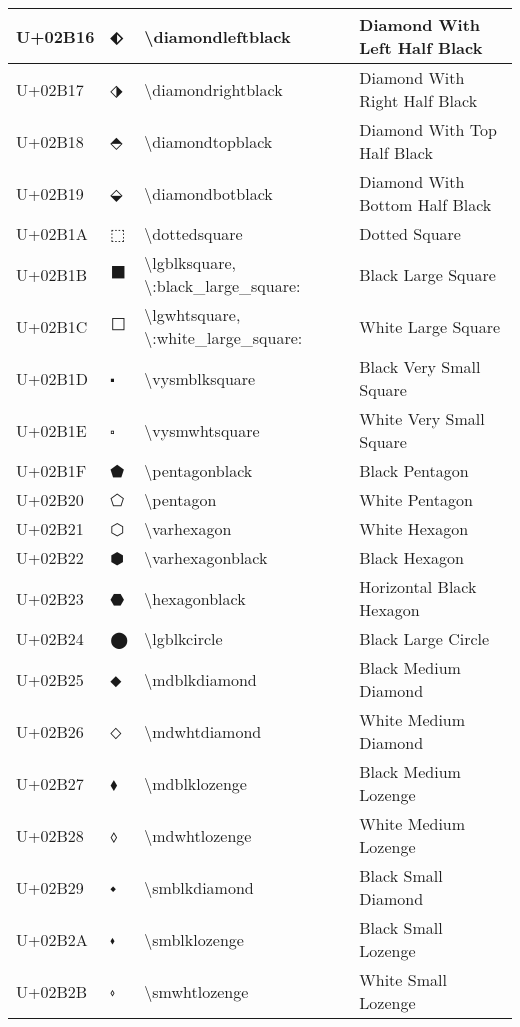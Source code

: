 \begin{table}[h]
\begin{tabulary}{\linewidth}{|L|L|L|L|}
\hline
U+02B16 & ⬖ & {\textbackslash}diamondleftblack & Diamond With Left Half Black \\
\hline
U+02B17 & ⬗ & {\textbackslash}diamondrightblack & Diamond With Right Half Black \\
\hline
U+02B18 & ⬘ & {\textbackslash}diamondtopblack & Diamond With Top Half Black \\
\hline
U+02B19 & ⬙ & {\textbackslash}diamondbotblack & Diamond With Bottom Half Black \\
\hline
U+02B1A & ⬚ & {\textbackslash}dottedsquare & Dotted Square \\
\hline
U+02B1B & ⬛ & {\textbackslash}lgblksquare, {\textbackslash}:black\_large\_square: & Black Large Square \\
\hline
U+02B1C & ⬜ & {\textbackslash}lgwhtsquare, {\textbackslash}:white\_large\_square: & White Large Square \\
\hline
U+02B1D & ⬝ & {\textbackslash}vysmblksquare & Black Very Small Square \\
\hline
U+02B1E & ⬞ & {\textbackslash}vysmwhtsquare & White Very Small Square \\
\hline
U+02B1F & ⬟ & {\textbackslash}pentagonblack & Black Pentagon \\
\hline
U+02B20 & ⬠ & {\textbackslash}pentagon & White Pentagon \\
\hline
U+02B21 & ⬡ & {\textbackslash}varhexagon & White Hexagon \\
\hline
U+02B22 & ⬢ & {\textbackslash}varhexagonblack & Black Hexagon \\
\hline
U+02B23 & ⬣ & {\textbackslash}hexagonblack & Horizontal Black Hexagon \\
\hline
U+02B24 & ⬤ & {\textbackslash}lgblkcircle & Black Large Circle \\
\hline
U+02B25 & ⬥ & {\textbackslash}mdblkdiamond & Black Medium Diamond \\
\hline
U+02B26 & ⬦ & {\textbackslash}mdwhtdiamond & White Medium Diamond \\
\hline
U+02B27 & ⬧ & {\textbackslash}mdblklozenge & Black Medium Lozenge \\
\hline
U+02B28 & ⬨ & {\textbackslash}mdwhtlozenge & White Medium Lozenge \\
\hline
U+02B29 & ⬩ & {\textbackslash}smblkdiamond & Black Small Diamond \\
\hline
U+02B2A & ⬪ & {\textbackslash}smblklozenge & Black Small Lozenge \\
\hline
U+02B2B & ⬫ & {\textbackslash}smwhtlozenge & White Small Lozenge \\

\end{tabulary}
\end{table}
